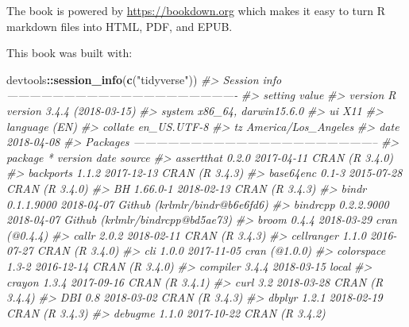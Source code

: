 \documentclass[]{book}
\newenvironment{Shaded}{\begin{snugshade}}{\end{snugshade}}
\newcommand{\KeywordTok}[1]{\textcolor[rgb]{0.13,0.29,0.53}{\textbf{#1}}}
\newcommand{\StringTok}[1]{\textcolor[rgb]{0.31,0.60,0.02}{#1}}
\newcommand{\CommentTok}[1]{\textcolor[rgb]{0.56,0.35,0.01}{\textit{#1}}}
\newcommand{\OperatorTok}[1]{\textcolor[rgb]{0.81,0.36,0.00}{\textbf{#1}}}
\newcommand{\NormalTok}[1]{#1}
\theoremstyle{definition}
\theoremstyle{definition}
\theoremstyle{definition}
\theoremstyle{remark}
\begin{document}
The book is powered by \url{https://bookdown.org} which makes it easy to
turn R markdown files into HTML, PDF, and EPUB.

This book was built with:

\begin{Shaded}
\begin{Highlighting}[]
\NormalTok{devtools}\OperatorTok{::}\KeywordTok{session_info}\NormalTok{(}\KeywordTok{c}\NormalTok{(}\StringTok{"tidyverse"}\NormalTok{))}
\CommentTok{#> Session info -------------------------------------------------------------}
\CommentTok{#>  setting  value                       }
\CommentTok{#>  version  R version 3.4.4 (2018-03-15)}
\CommentTok{#>  system   x86_64, darwin15.6.0        }
\CommentTok{#>  ui       X11                         }
\CommentTok{#>  language (EN)                        }
\CommentTok{#>  collate  en_US.UTF-8                 }
\CommentTok{#>  tz       America/Los_Angeles         }
\CommentTok{#>  date     2018-04-08}
\CommentTok{#> Packages -----------------------------------------------------------------}
\CommentTok{#>  package      * version    date       source                          }
\CommentTok{#>  assertthat     0.2.0      2017-04-11 CRAN (R 3.4.0)                  }
\CommentTok{#>  backports      1.1.2      2017-12-13 CRAN (R 3.4.3)                  }
\CommentTok{#>  base64enc      0.1-3      2015-07-28 CRAN (R 3.4.0)                  }
\CommentTok{#>  BH             1.66.0-1   2018-02-13 CRAN (R 3.4.3)                  }
\CommentTok{#>  bindr          0.1.1.9000 2018-04-07 Github (krlmlr/bindr@b6e6fd6)   }
\CommentTok{#>  bindrcpp       0.2.2.9000 2018-04-07 Github (krlmlr/bindrcpp@bd5ae73)}
\CommentTok{#>  broom          0.4.4      2018-03-29 cran (@0.4.4)                   }
\CommentTok{#>  callr          2.0.2      2018-02-11 CRAN (R 3.4.3)                  }
\CommentTok{#>  cellranger     1.1.0      2016-07-27 CRAN (R 3.4.0)                  }
\CommentTok{#>  cli            1.0.0      2017-11-05 cran (@1.0.0)                   }
\CommentTok{#>  colorspace     1.3-2      2016-12-14 CRAN (R 3.4.0)                  }
\CommentTok{#>  compiler       3.4.4      2018-03-15 local                           }
\CommentTok{#>  crayon         1.3.4      2017-09-16 CRAN (R 3.4.1)                  }
\CommentTok{#>  curl           3.2        2018-03-28 CRAN (R 3.4.4)                  }
\CommentTok{#>  DBI            0.8        2018-03-02 CRAN (R 3.4.3)                  }
\CommentTok{#>  dbplyr         1.2.1      2018-02-19 CRAN (R 3.4.3)                  }
\CommentTok{#>  debugme        1.1.0      2017-10-22 CRAN (R 3.4.2)                  }

\end{Highlighting}
\end{Shaded}
\end{document}
